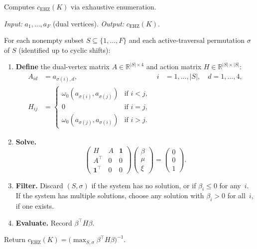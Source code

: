 \begin{algorithm}\label{alg:ehz}
Computes $c_{\mathrm{EHZ}}(K)$ via exhaustive enumeration.

\smallskip\noindent
\emph{Input:} $a_1, \ldots, a_F$ (dual vertices).
\quad
\emph{Output:} $c_{\mathrm{EHZ}}(K)$.

\smallskip\noindent
For each nonempty subset $S \subseteq \{1, \ldots, F\}$
and each active-traversal permutation $\sigma$ of $S$
(identified up to cyclic shifts):

\begin{enumerate}
\item \textbf{Define}
  the dual-vertex matrix $A \in \mathbb{R}^{|S| \times 4}$
  and action matrix $H \in \mathbb{R}^{|S| \times |S|}$:
  \begin{align*}
    A_{id} &= a_{\sigma(i),d},
      & i &= 1, \ldots, |S|, \quad d = 1, \ldots, 4, \\
    H_{ij} &= \begin{cases}
      \omega_0(a_{\sigma(i)}, a_{\sigma(j)}) & \text{if } i < j, \\
      0 & \text{if } i = j, \\
      \omega_0(a_{\sigma(j)}, a_{\sigma(i)}) & \text{if } i > j.
    \end{cases}
  \end{align*}

\item \textbf{Solve.}
  \[
    \begin{pmatrix} H & A & \mathbf{1} \\ A^\top & 0 & 0 \\ \mathbf{1}^\top & 0 & 0 \end{pmatrix}
    \begin{pmatrix} \beta \\ \mu \\ \xi \end{pmatrix}
    = \begin{pmatrix} 0 \\ 0 \\ 1 \end{pmatrix}.
  \]

\item \textbf{Filter.}
  Discard $(S, \sigma)$ if the system has no solution, or
  if $\beta_i \leq 0$ for any~$i$.
  If the system has multiple solutions, choose any solution
  with $\beta_i > 0$ for all~$i$, if one exists.

\item \textbf{Evaluate.}
  Record $\beta^\top H \beta$.
\end{enumerate}

\noindent
Return
$c_{\mathrm{EHZ}}(K) = \bigl(\max_{S,\sigma} \beta^\top H \beta\bigr)^{-1}$.
\end{algorithm}



